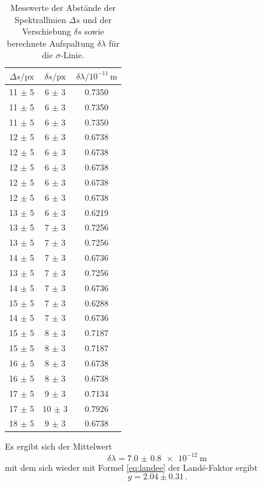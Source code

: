 \begin{table}[h]
    \centering
    \caption{Messwerte der Abstände der Spektrallinien $\Delta s$ und der Verschiebung $\delta s$ sowie berechnete Aufspaltung $\delta \lambda$ für die $\sigma$-Linie.}
    \label{tab:atab4}
    \begin{tabular}{c c c}
        \toprule
        {$\Delta s / \text{px}$} & {$\delta s / \text{px}$} & {$\delta \lambda / 10^{-11}\, \si{\meter}$}\\
        \midrule
        11 $\pm$ 5 & 6  $\pm$ 3 & 0.7350 \\
        11 $\pm$ 5 & 6  $\pm$ 3 & 0.7350 \\
        11 $\pm$ 5 & 6  $\pm$ 3 & 0.7350 \\
        12 $\pm$ 5 & 6  $\pm$ 3 & 0.6738 \\
        12 $\pm$ 5 & 6  $\pm$ 3 & 0.6738 \\
        12 $\pm$ 5 & 6  $\pm$ 3 & 0.6738 \\
        12 $\pm$ 5 & 6  $\pm$ 3 & 0.6738 \\
        12 $\pm$ 5 & 6  $\pm$ 3 & 0.6738 \\
        13 $\pm$ 5 & 6  $\pm$ 3 & 0.6219 \\
        13 $\pm$ 5 & 7  $\pm$ 3 & 0.7256 \\
        13 $\pm$ 5 & 7  $\pm$ 3 & 0.7256 \\
        14 $\pm$ 5 & 7  $\pm$ 3 & 0.6736 \\
        13 $\pm$ 5 & 7  $\pm$ 3 & 0.7256 \\
        14 $\pm$ 5 & 7  $\pm$ 3 & 0.6736 \\
        15 $\pm$ 5 & 7  $\pm$ 3 & 0.6288 \\
        14 $\pm$ 5 & 7  $\pm$ 3 & 0.6736 \\
        15 $\pm$ 5 & 8  $\pm$ 3 & 0.7187 \\
        15 $\pm$ 5 & 8  $\pm$ 3 & 0.7187 \\
        16 $\pm$ 5 & 8  $\pm$ 3 & 0.6738 \\
        16 $\pm$ 5 & 8  $\pm$ 3 & 0.6738 \\
        17 $\pm$ 5 & 9  $\pm$ 3 & 0.7134 \\
        17 $\pm$ 5 & 10 $\pm$ 3 & 0.7926 \\
        18 $\pm$ 5 & 9  $\pm$ 3 & 0.6738 \\
        \bottomrule
    \end{tabular}
\end{table}
\FloatBarrier
\noindent
Es ergibt sich der Mittelwert
\begin{equation*}
    \delta \lambda = \SI{7.0(08)e-12}{\meter} \, 
\end{equation*}
mit dem sich wieder mit Formel \eqref{eq:landee} der Landé-Faktor ergibt
\begin{equation*}
    g = 2.04 \pm 0.31 \, .
\end{equation*}

